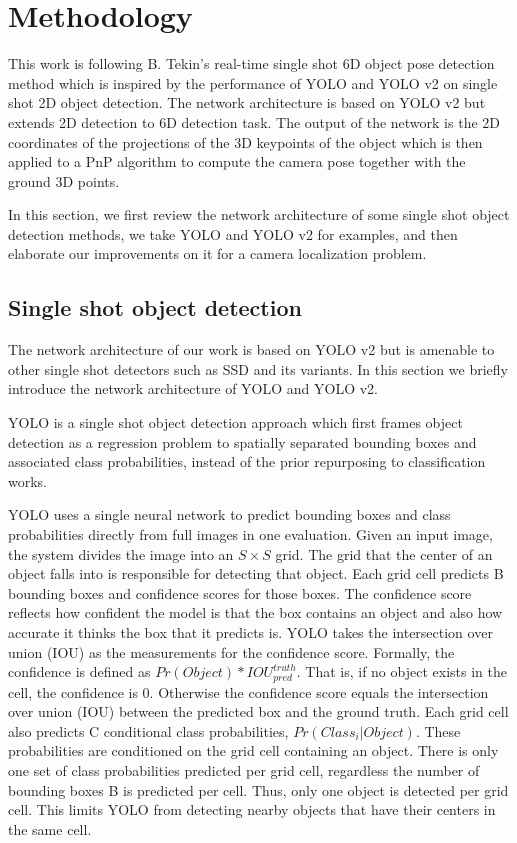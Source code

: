 \chapter{Methodology}

This work is following B. Tekin's real-time single shot 6D object pose detection method \cite{tekin2018real} which is inspired by the performance of YOLO \cite{redmon2016you} and YOLO v2 on single shot 2D object detection. The network architecture is based on YOLO v2  but extends 2D detection to 6D detection task. The output of the network is the 2D coordinates of the projections of the 3D keypoints of the object which is then applied to a PnP algorithm to compute the camera pose together with the ground 3D points.

In this section, we first review the network architecture of some single shot object detection methods, we take YOLO and YOLO v2  for examples, and then elaborate our improvements on it for a camera localization problem.

\section{Single shot object detection}

The network architecture of our work is based on YOLO v2 but is amenable to other single shot detectors such as SSD and its variants. In this section we briefly introduce the network architecture of YOLO and YOLO v2.

YOLO \cite{redmon2016you} is a single shot object detection approach which first frames object detection as a regression problem to spatially separated bounding boxes and associated class probabilities, instead of the prior repurposing to classification works.

YOLO uses a single neural network to predict bounding boxes and class probabilities directly from full images in one evaluation. Given an input image, the system divides the image into an $S \times S$ grid. The grid that the center of an object falls into is responsible for detecting that object. Each grid cell predicts B bounding boxes and confidence scores for those boxes. The confidence score reflects how confident the model is that the box contains an object and also how accurate it thinks the box that it predicts is. YOLO takes the intersection over union (IOU) as the measurements for the confidence score. Formally, the confidence is defined as $Pr(Object) * IOU_{pred}^{truth}$. That is, if no object exists in the cell, the confidence is 0. Otherwise the confidence score equals the intersection over union (IOU) between the predicted box and the ground truth. Each grid cell also predicts C conditional class probabilities, $Pr(Class_{i}|Object)$. These probabilities are conditioned on the grid cell containing an object. There is only one set of class probabilities predicted per grid cell, regardless the number of bounding boxes B is predicted per cell. Thus, only one object is detected per grid cell. This limits YOLO from detecting nearby objects that have their centers in the same cell.

